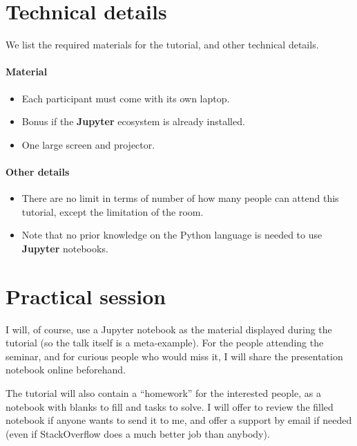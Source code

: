 \documentclass[runningheads]{llncs}
\newcommand{\Jupyter}{\textbf{Jupyter}}
\begin{document}
\section{Technical details}

We list the required materials for the tutorial, and other technical details.

\paragraph{Material}

\begin{itemize}
    \item Each participant must come with its own laptop.
    \item Bonus if the \Jupyter{} ecosystem is already installed.
    \item One large screen and projector.
\end{itemize}


\paragraph{Other details}

\begin{itemize}
    \item There are no limit in terms of number of how many people can attend this tutorial, except the limitation of the room.
    \item Note that no prior knowledge on the Python language is needed to use \Jupyter{} notebooks.
\end{itemize}



\section{Practical session}

I will, of course, use a Jupyter notebook as the material displayed during the tutorial (so the talk itself is a meta-example).
For the people attending the seminar, and for curious people who would miss it, I will share the presentation notebook online beforehand.

The tutorial will also contain a ``homework'' for the interested people, as a notebook with blanks to fill and tasks to solve.
I will offer to review the filled notebook if anyone wants to send it to me, and offer a support by email if needed (even if StackOverflow does a much better job than anybody).
\end{document}
